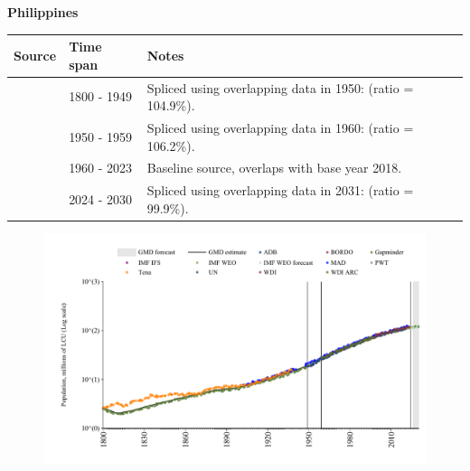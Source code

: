 \documentclass[12pt,a4paper,landscape]{article}
\begin{document}
\begin{adjustbox}{max totalsize={\paperwidth}{\paperheight},center}
\begin{minipage}[t][\textheight][t]{\textwidth}
\vspace*{0.5cm}
{}
\begin{center}
{\Large\bfseries Philippines}
\end{center}
\vspace{0.5cm}
\begin{table}[H]
\centering
\small
\begin{tabular}{|l|l|l|}
\hline
\textbf{Source} & \textbf{Time span} & \textbf{Notes} \\
\hline
\rowcolor{white}\cite{Gapminder}& 1800 - 1949 &Spliced using overlapping data in 1950: (ratio = 104.9\%).\\
\rowcolor{lightgray}\cite{IMF_IFS}& 1950 - 1959 &Spliced using overlapping data in 1960: (ratio = 106.2\%).\\
\rowcolor{white}\cite{WDI}& 1960 - 2023 &Baseline source, overlaps with base year 2018.\\
\rowcolor{lightgray}\cite{Gapminder}& 2024 - 2030 &Spliced using overlapping data in 2031: (ratio = 99.9\%).\\
\hline
\end{tabular}
\end{table}
\begin{figure}[H]
\centering
\includegraphics[width=\textwidth,height=0.6\textheight,keepaspectratio]{graphs/PHL_pop.pdf}
\end{figure}
\end{minipage}
\end{adjustbox}
\end{document}
